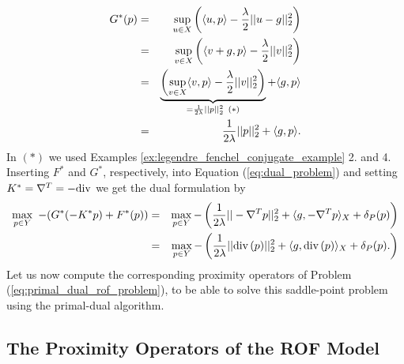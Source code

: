 \documentclass[abstracton]{scrreprt}
\begin{document}
                \begin{eqnarray}
                    G^{\ast}(p) &=& \sup_{u \in X} \left( \langle u, p \rangle - \frac{\lambda}{2} ||u - g||_{2}^{2} \right) \notag \\
                    &=& \sup_{v \in X} \left( \langle v + g, p \rangle - \frac{\lambda}{2} ||v||_{2}^{2} \right) \notag \\
                    &=& \underbrace{\left( \sup_{v \in X} \langle v, p \rangle - \frac{\lambda}{2} ||v||_{2}^{2} \right)}_{= \frac{1}{2\lambda} ||p||_{2}^{2} \,\,\, (\ast)} + \langle g, p \rangle \notag \\
                    &=& \frac{1}{2\lambda} ||p||_{2}^{2} + \langle g, p \rangle. \notag
                \end{eqnarray}
            In $(\ast)$ we used Examples \ref{ex:legendre_fenchel_conjugate_example} 2. and 4. Inserting $F^{\ast}$ and $G^{\ast}$, respectively, into Equation (\ref{eq:dual_problem}) and setting $K^{\ast} = \nabla^{T} = -\textnormal{div}$ we get the dual formulation by
                \begin{eqnarray}
                    \max_{p \in Y}\,\, -(G^{\ast}(-K^{\ast}p) + F^{\ast}(p)) &=& \max_{p \in Y} - \left( \frac{1}{2\lambda} ||-\nabla^{T}p||^{2}_{2} + \langle g, -\nabla^{T}p \rangle_{X} + \delta_{P}(p) \right) \notag \\
                    &=& \max_{p \in Y} - \left( \frac{1}{2\lambda} ||\textnormal{div}\,(p)||^{2}_{2} + \langle g, \textnormal{div}\,(p) \rangle_{X} + \delta_{P}(p). \right) \notag
                \end{eqnarray}
            Let us now compute the corresponding proximity operators of Problem (\ref{eq:primal_dual_rof_problem}), to be able to solve this saddle-point problem using the primal-dual algorithm.
        \subsection{The Proximity Operators of the ROF Model} %
        \label{sub:the_proximity_operators_for_the_rof_model}
\end{document}
